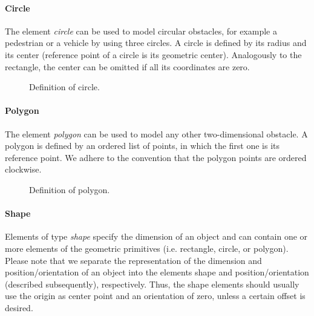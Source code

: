 \paragraph{Circle}
The element \textit{circle} can be used to model circular obstacles, for example a pedestrian or a vehicle by using three circles.
A circle is defined by its radius and its center (reference point of a circle is its geometric center).
Analogously to the rectangle, the center can be omitted if all its coordinates are zero.
\begin{figure}[!htpb]
	\small
	\caption{Definition of circle.}
	\label{fig:auxiliary}
\end{figure}

\paragraph{Polygon}
The element \textit{polygon} can be used to model any other two-dimensional obstacle. 
A polygon is defined by an ordered list of points, in which the first one is its reference point. 
We adhere to the convention that the polygon points are ordered clockwise.
\begin{figure}[!htpb]
	\small
	\caption{Definition of polygon.}
	\label{fig:auxiliary}
\end{figure}



\paragraph{Shape}
Elements of type \emph{shape} specify the dimension of an object and can contain one or more elements of the geometric primitives (i.e. rectangle, circle, or polygon). Please note that we separate the representation of the dimension and position/orientation of an object into the elements shape and position/orientation (described subsequently), respectively. Thus, the shape elements should usually use the origin as center point and an orientation of zero, unless a certain offset is desired.

